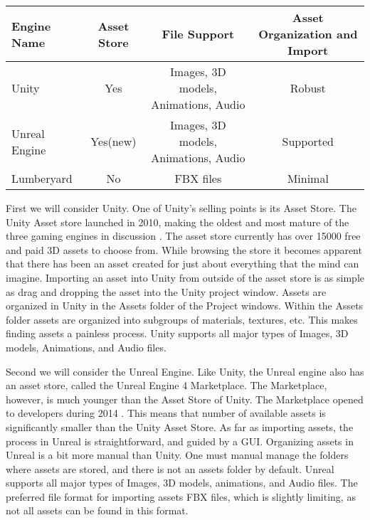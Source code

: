 \documentclass[10pt,journal,compsoc,onecolumn, draftclsnofoot]{IEEEtran}
\begin{document}
\vspace{2mm}
\begin{table}[h!]
\centering
  \begin{tabular}{ | l || c | c | c | }
  \hline
  Engine Name & Asset Store & File Support & Asset Organization and Import\\
  \hline
  Unity & Yes & Images, 3D models, Animations, Audio & Robust\\ \hline
  Unreal Engine & Yes(new) & Images, 3D models, Animations, Audio & Supported\\ \hline
  Lumberyard & No & FBX files & Minimal\\ \hline
  \end{tabular}
\end{table}
\vspace{2mm}

First we will consider Unity.
One of Unity's selling points is its Asset Store.
The Unity Asset store launched in 2010, making the oldest and most mature of the three gaming engines in discussion \cite{unity_store_age}.
The asset store currently has over 15000 free and paid 3D assets to choose from.
While browsing the store it becomes apparent that there has been an asset created for just about everything that the mind can imagine.
Importing an asset into Unity from outside of the asset store is as simple as drag and dropping the asset into the Unity project window.
Assets are organized in Unity in the Assets folder of the Project windows.
Within the Assets folder assets are organized into subgroups of materials, textures, etc.
This makes finding assets a painless process.
Unity supports all major types of Images, 3D models, Animations, and Audio files.

Second we will consider the Unreal Engine.
Like Unity, the Unreal engine also has an asset store, called the Unreal Engine 4 Marketplace.
The Marketplace, however, is much younger than the Asset Store of Unity.
The Marketplace opened to developers during 2014 \cite{unreal_marketplace_date}.
This means that number of available assets is significantly smaller than the Unity Asset Store.
As far as importing assets, the process in Unreal is straightforward, and guided by a GUI.
Organizing assets in Unreal is a bit more manual than Unity.
One must manual manage the folders where assets are stored, and there is not an assets folder by default.
Unreal supports all major types of Images, 3D models, animations, and Audio files.
The preferred file format for importing assets FBX files, which is slightly limiting, as not all assets can be found in this format.
\end{document}
